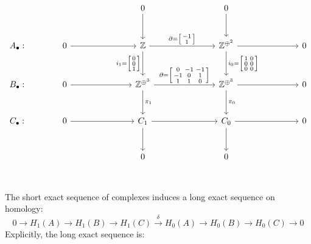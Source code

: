 \documentclass[11pt,a4paper]{report}
\begin{document}
\begin{Ex}
                \[
                  \begin{tikzcd}[ampersand replacement=\&, sep=large]
                        \& \            \&  \& 0 \arrow[d] \&  \& 0 \arrow[d] \& \& \\
                    A_\bullet: \& 0 \arrow[rr] \&  \& \mathbb{Z} \arrow[rr, "\partial = {\left[\begin{smallmatrix}-1\\1\end{smallmatrix}\right]}"] \arrow[d,swap,"i_1 = {\left[\begin{smallmatrix}0\\0\\1\end{smallmatrix}\right]}"] \&  \& \mathbb{Z}^{\oplus^{2}} \arrow[rr] \arrow[d, "i_0 = {\left[\begin{smallmatrix}1&0\\0&0\\0&0\end{smallmatrix}\right]}"] \&  \& 0\\
                    B_\bullet: \& 0 \arrow[rr] \&  \& \mathbb{Z}^{\oplus^{3}} \arrow[rr, "\partial = {\left[\begin{smallmatrix}0&-1&-1\\-1&0&1\\1&1&0\end{smallmatrix}\right]}"] \arrow[d, "\pi_1"] \&  \& \mathbb{Z}^{\oplus^{3}} \arrow[d, "\pi_0"] \arrow[rr] \&  \& 0\\
                    C_\bullet: \& 0 \arrow[rr] \&  \& C_1        \arrow[rr] \arrow[d] \&  \& C_0               \arrow[d] \arrow[rr] \&  \& 0\\
                        \& \            \&  \& 0                               \&  \& 0\\
                  \end{tikzcd}
                \]
                The short exact sequence of complexes induces a long exact sequence on homology:
                \[
                0 \rightarrow H_1(A) \rightarrow H_1(B) \rightarrow H_1(C) \xrightarrow{\delta} H_0(A) \rightarrow H_0(B) \rightarrow H_0(C) \rightarrow 0 \]
                Explicitly, the long exact sequence is:


\end{Ex}
\end{document}
